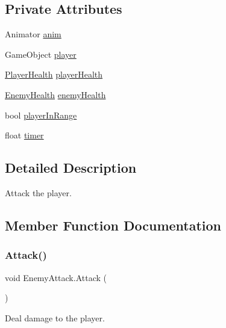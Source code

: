 \subsection*{Private Attributes}
\begin{DoxyCompactItemize}
\item 
Animator \mbox{\hyperlink{class_enemy_attack_ac159cd8983d8b95eb0fd0ad822bee0d4}{anim}}
\item 
Game\+Object \mbox{\hyperlink{class_enemy_attack_a07b5a1f9b215ae63e87e656da45fc667}{player}}
\item 
\mbox{\hyperlink{class_player_health}{Player\+Health}} \mbox{\hyperlink{class_enemy_attack_a5ceda5813bb453137adcb80249e92013}{player\+Health}}
\item 
\mbox{\hyperlink{class_enemy_health}{Enemy\+Health}} \mbox{\hyperlink{class_enemy_attack_a6eb2ddb94cb1caedbfd89edb4b55ca58}{enemy\+Health}}
\item 
bool \mbox{\hyperlink{class_enemy_attack_a26fa44f78b3cd6d19d134e46324d0403}{player\+In\+Range}}
\item 
float \mbox{\hyperlink{class_enemy_attack_a0040c75208554b4fa78eccf289c206af}{timer}}
\end{DoxyCompactItemize}


\subsection{Detailed Description}
Attack the player. 

\subsection{Member Function Documentation}
\mbox{\label{class_enemy_attack_a44753db46321d7ac4a32b6f41426d36d}} 
\subsubsection{\texorpdfstring{Attack()}{Attack()}}
{\footnotesize\ttfamily void Enemy\+Attack.\+Attack (\begin{DoxyParamCaption}{ }\end{DoxyParamCaption})\hspace{0.3cm}{\ttfamily [private]}}



Deal damage to the player. 

